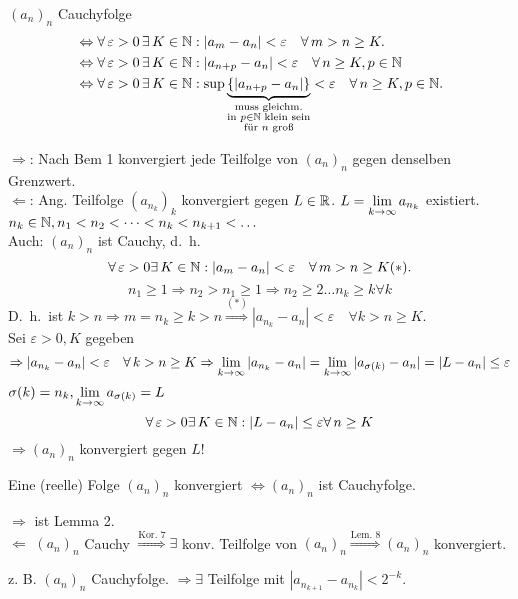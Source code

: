 \documentclass[../ana1.tex]{subfiles}
\begin{document}
\begin{bem}
	\( {(a_n)}_n \) Cauchyfolge \\
	\begin{align*}
		&\Leftrightarrow \forall \varepsilon>0 \,\exists K\in\N:|a_m-a_n|<\varepsilon \quad \forall m>n\geq K.\\
		&\Leftrightarrow \forall \varepsilon>0 \,\exists K\in\N:|a_{n+p}-a_n|<\varepsilon \quad \forall n\geq K, p\in\N \\
		&\Leftrightarrow \forall \varepsilon>0 \,\exists K\in\N:\sup \underbrace{\set{|a_{n+p}-a_n|}}_{\substack{\text{muss gleichm.}\\\text{in }p\in\N\text{ klein sein}\\ \text{für } n \text{ groß} }}<\varepsilon \quad \forall n\geq K, p\in\N.
	\end{align*}
\end{bem}
\begin{bew}
	\glqq{}\( \Rightarrow \)\grqq{}: Nach Bem 1 konvergiert jede Teilfolge von \( {(a_n)}_n \) gegen denselben Grenzwert.\\
	\glqq{}\(\Leftarrow \)\grqq{}: Ang. Teilfolge \( {(a_{n_k})}_k \) konvergiert gegen \(L\in\mathbb{R} \). \(L = \lim\limits_{k\rightarrow\infty} a_{n_k} \) existiert.\\
	\( n_k\in\mathbb{N}, n_1<n_2<\cdots<n_k<n_{k+1}<\ldots \) \\
	Auch: \({(a_n)}_n\) ist Cauchy, d.\ h.\ 
	\[ \forall \varepsilon>0\exists K\in\N:|a_m-a_n|<\varepsilon \quad\forall m>n\geq K (*). \]
	\[n_1 \geq 1 \Rightarrow n_2 > n_1 \geq 1 \Rightarrow n_2 \geq 2 \ldots n_k \geq k \forall k \]
	D.\ h.\ ist \(k>n \Rightarrow m=n_k \geq k>n \overset{(*)}{\Rightarrow} |a_{n_k}-a_n|<\varepsilon \quad \forall k>n\geq K \).\\
	Sei \( \varepsilon>0, K\) gegeben\\
	\[ \Rightarrow |a_{n_k} - a_n| <\varepsilon \quad \forall k>n\geq K \Rightarrow \limes{k} |a_{n_k}-a_n| = \limes{k} |a_{\sigma(k)}-a_n| = |L-a_n| \leq \varepsilon \]
	\(\sigma(k) = n_k, \lim\limits_{k\rightarrow\infty} a_{\sigma(k)} = L \)
	\[ \forall \varepsilon>0 \exists K\in\N: |L-a_n|\leq \varepsilon \forall n\geq K \]
	\(\Rightarrow {(a_n)}_n\) konvergiert gegen \(L\)!
\end{bew}
\begin{satz}
	Eine (reelle) Folge \({(a_n)}_n\) konvergiert \( \Leftrightarrow {(a_n)}_n \) ist Cauchyfolge.
\end{satz}
\begin{bew}
	\glqq{}\(\Rightarrow \)\grqq{} ist Lemma 2.\\
	\glqq{}\( \Leftarrow \)\grqq{} \({(a_n)}_n\) Cauchy \( \overset{\text{Kor. 7}}{\Rightarrow} \exists \) konv. Teilfolge von \({(a_n)}_n \overset{\text{Lem. 8}}{\Rightarrow} {(a_n)}_n \) konvergiert. 
\end{bew}
z. B. \({(a_n)}_n\) Cauchyfolge. \(\Rightarrow \exists \) Teilfolge mit \(|a_{n_{k+1}}-a_{n_k}| <2^{-k}\).
\end{document}
